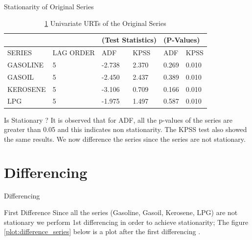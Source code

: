 \documentclass{beamer}
\begin{document}
	\begin{frame}{Stationarity of Original Series}
		\begin{table}[]
			\caption{ \ref{table:stationarity_original} Univariate URTs of the Original Series}
			\label{table:stationarity_original}
			\begin{tabular}{llllll}
\hline
&  & \multicolumn{2}{l}{(Test Statistics)} & \multicolumn{2}{l}{(P-Values)} \\ \hline

SERIES   & LAG ORDER & ADF    & KPSS      & ADF    & KPSS           \\

GASOLINE & 5         & -2.738 & 2.370     & 0.269  & 0.010          \\

GASOIL   & 5         & -2.450 & 2.437     & 0.389  & 0.010          \\

KEROSENE & 5         & -3.106 & 0.709     & 0.166  & 0.010          \\

LPG      & 5         & -1.975 & 1.497     & 0.587  & 0.010          \\ \hline
			\end{tabular}
		\end{table}
	
	\begin{alertblock}{Is Stationary ?}
		\vspace{5pt}
		It is observed that for ADF, all the p-values of the series are greater than 0.05 and this indicates non stationarity. The KPSS test also showed the same results. We now  difference the series since the series are not stationary.
	\end{alertblock}
	\end{frame}
	
	\section{Differencing}
	\begin{frame}{Differencing}

			\begin{alertblock}{First Difference}
				\vspace{5pt}
				Since all the series (Gasoline, Gasoil, Kerosene, LPG) are not stationary we perform 1st differencing in order to achieve stationarity;
				The figure \ref{plot:difference_series} below is a plot after the first differencing .
				\vspace{5pt}
			\end{alertblock}
		
	\end{frame}
	
\end{document}
